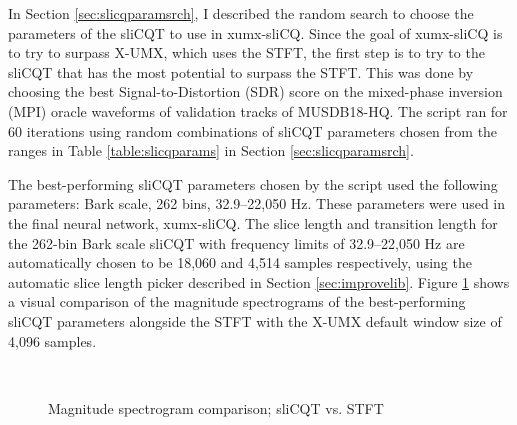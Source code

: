 \documentclass[report.tex]{subfiles}
\begin{document}
In Section \ref{sec:slicqparamsrch}, I described the random search to choose the parameters of the sliCQT to use in xumx-sliCQ. Since the goal of xumx-sliCQ is to try to surpass X-UMX, which uses the STFT, the first step is to try to the sliCQT that has the most potential to surpass the STFT. This was done by choosing the best Signal-to-Distortion (SDR) score on the mixed-phase inversion (MPI) oracle waveforms of validation tracks of MUSDB18-HQ. The script ran for 60 iterations using random combinations of sliCQT parameters chosen from the ranges in Table \ref{table:slicqparams} in Section \ref{sec:slicqparamsrch}.

The best-performing sliCQT parameters chosen by the script used the following parameters: Bark scale, 262 bins, 32.9--22,050 Hz. These parameters were used in the final neural network, xumx-sliCQ. The slice length and transition length for the 262-bin Bark scale sliCQT with frequency limits of 32.9--22,050 Hz are automatically chosen to be 18,060 and 4,514 samples respectively, using the automatic slice length picker described in Section \ref{sec:improvelib}. Figure \ref{fig:bipolarslicqs} shows a visual comparison of the magnitude spectrograms of the best-performing sliCQT parameters alongside the STFT with the X-UMX default window size of 4,096 samples.

\begin{figure}[ht]
	\centering
	\\
	\caption{Magnitude spectrogram comparison; sliCQT vs. STFT}
	\label{fig:bipolarslicqs}
\end{figure}
\end{document}
